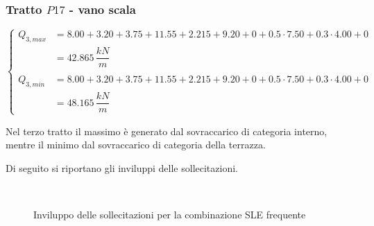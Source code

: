 \subsubsection*{Tratto $P17$ - vano scala}
\begin{equation*}
	\begin{cases}
		Q_{3,max} &= 8.00+3.20+3.75 + 11.55+2.215+9.20 + 0+ 0.5\cdot7.50+ 0.3\cdot4.00 +0\\
		&= 42.865\,\dfrac{kN}{m}\\\\
		Q_{3,min} &= 8.00+3.20+3.75 + 11.55+2.215+9.20 + 0 + 0.5\cdot7.50 +0.3\cdot 4.00 + 0\\
		&= 48.165\,\dfrac{kN}{m}
	\end{cases}
\end{equation*}

Nel terzo tratto il massimo è generato dal sovraccarico di categoria interno, mentre il minimo dal sovraccarico di categoria della terrazza.

Di seguito si riportano gli  inviluppi delle sollecitazioni.

\begin{figure}
	\centering
	\\
	\caption{Inviluppo delle sollecitazioni per la combinazione SLE frequente}
	\label{fig:sleFreqEnvelope}
\end{figure}

